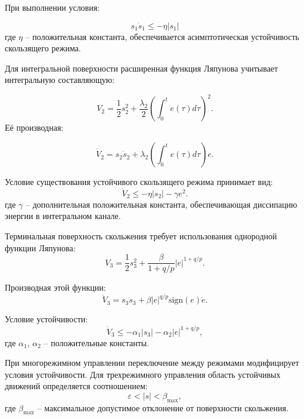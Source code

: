 При выполнении условия:

\begin{equation}
	s_1\dot{s}_1 \leq -\eta|s_1|
\end{equation}
где $\eta$ -- положительная константа, обеспечивается асимптотическая устойчивость скользящего режима.

Для интегральной поверхности расширенная функция Ляпунова учитывает интегральную составляющую:

\begin{equation}
	V_2 = \frac{1}{2}s_2^2 + \frac{\lambda_2}{2}\left(\int_0^t e(\tau)d\tau\right)^2.
\end{equation}
Её производная:

\begin{equation}
	\dot{V}_2 = s_2\dot{s}_2 + \lambda_2\left(\int_0^t e(\tau)d\tau\right)e.
\end{equation}

Условие существования устойчивого скользящего режима принимает вид:
\begin{equation}
	\dot{V}_2 \leq -\eta|s_2| - \gamma e^2.
\end{equation}
где $\gamma$ -- дополнительная положительная константа, обеспечивающая диссипацию энергии в интегральном канале.

Терминальная поверхность скольжения требует использования однородной функции Ляпунова:
\begin{equation}
	V_3 = \frac{1}{2}s_3^2 + \frac{\beta}{1+q/p}|e|^{1+q/p}.
\end{equation}

Производная этой функции:
\begin{equation}
	\dot{V}_3 = s_3\dot{s}_3 + \beta|e|^{q/p}\text{sign}(e)\dot{e}.
\end{equation}

Условие устойчивости:
\begin{equation}
	\dot{V}_3 \leq -\alpha_1|s_3| - \alpha_2|e|^{1+q/p},
\end{equation}
где $\alpha_1$, $\alpha_2$ -- положительные константы.

При многорежимном управлении переключение между режимами модифицирует
условия устойчивости. Для трехрежимного управления
область устойчивых движений определяется соотношением:
\begin{equation}
	\varepsilon < |s| < \beta_{\text{max}},
\end{equation}
где $\beta_{\text{max}}$ -- максимальное допустимое отклонение от поверхности скольжения.

